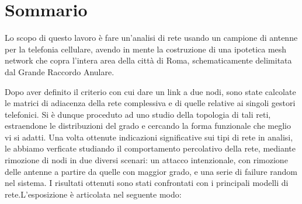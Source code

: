
{}
\section*{Sommario}

Lo scopo di questo lavoro è fare un'analisi di rete usando un campione di antenne per la telefonia cellulare, avendo in mente la costruzione di una ipotetica mesh network che copra l'intera area della città di Roma, schematicamente delimitata dal Grande Raccordo Anulare.

Dopo aver definito il criterio con cui dare un link a due nodi, sono state calcolate le matrici di adiacenza della rete complessiva e di quelle relative ai singoli gestori telefonici. Si è dunque proceduto ad uno studio della topologia di tali reti, estraendone le distribuzioni del grado e cercando la forma funzionale che meglio vi si adatti. Una volta ottenute indicazioni significative sui tipi di rete in analisi, le abbiamo verficate studiando il comportamento percolativo della rete, mediante rimozione di nodi in due diversi scenari: un attacco intenzionale, con rimozione delle antenne a partire da quelle con maggior grado, e una serie di failure random nel sistema. I risultati ottenuti sono stati confrontati con i principali modelli di rete.L'esposizione è articolata nel seguente modo:

